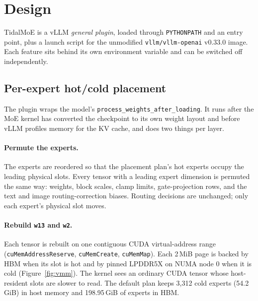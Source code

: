 \documentclass{article}
\newcommand{\figref}[1]{Figure~\ref{#1}}
\begin{document}
\section{Design}\label{sec:design}
TidalMoE is a vLLM \emph{general plugin}, loaded through \texttt{PYTHONPATH} and an entry point, plus a launch script
for the unmodified \texttt{vllm/vllm-openai} v0.33.0 image. Each feature sits behind its own environment variable and
can be switched off independently.

\subsection{Per-expert hot/cold placement}\label{sec:placement}
The plugin wraps the model's \texttt{process\_weights\_after\_loading}. It runs after the MoE kernel has converted the
checkpoint to its own weight layout and before vLLM profiles memory for the KV cache, and does two things per layer.

\paragraph{Permute the experts.} The experts are reordered so that the placement plan's hot experts occupy the leading
physical slots. Every tensor with a leading expert dimension is permuted the same way: weights, block scales, clamp
limits, gate-projection rows, and the text and image routing-correction biases. Routing decisions are unchanged; only
each expert's physical slot moves.

\paragraph{Rebuild \texttt{w13} and \texttt{w2}.} Each tensor is rebuilt on one contiguous CUDA virtual-address range
(\texttt{cuMemAddressReserve}, \texttt{cuMemCreate}, \texttt{cuMemMap}). Each 2\,MiB page is backed by HBM when its slot
is hot and by pinned LPDDR5X on NUMA node 0 when it is cold (\figref{fig:vmm}). The kernel sees an ordinary CUDA tensor
whose host-resident slots are slower to read. The default plan keeps 3,312 cold experts (54.2\,GiB) in host memory and
198.95\,GiB of experts in HBM.
\end{document}
